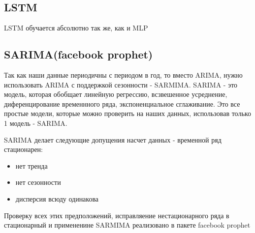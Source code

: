 \documentclass[11pt]{article}
\begin{document}
\subsection{LSTM}
\label{sec:orge03b6de}
LSTM обучается абсолютно так же, как и MLP
\subsection{SARIMA(facebook prophet)}
\label{sec:org378c071}
Так как наши данные периодичны с периодом в год, то вместо ARIMA, нужно использовать ARIMA с поддержкой сезонности -
SARMIMA. SARIMA - это модель, которая обобщает линейную регрессию, всзвешенное усреднение, диференцирование временнного
ряда, экспоненциальное сглаживание. Это все простые модели, которые можно проверить на наших данных, использовав только
1 модель - SARIMA.

SARIMA делает следующие допущения насчет данных - временной ряд стационарен:
\begin{itemize}
\item нет тренда
\item нет сезонности
\item дисперсия всюду одинакова
\end{itemize}

Проверку всех этих предположений, исправляение нестационарного ряда в стационарный и примененине SARMIMA реализовано в
пакете facebook prophet
\end{document}
